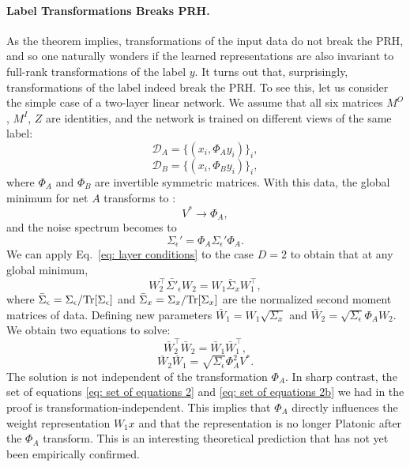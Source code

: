 \documentclass[11pt]{article}
\theoremstyle{plain}
\newcommand{\Tr}{{\rm Tr}}
\begin{document}
\paragraph{Label Transformations Breaks PRH.} As the theorem implies, transformations of the input data do not break the PRH, and so one naturally wonders if the learned representations are also invariant to full-rank transformations of the label $y$. It turns out that, surprisingly, transformations of the label indeed break the PRH. To see this, let us consider the simple case of a two-layer linear network. We assume that all six matrices $M^O$, $M^I$, $Z$ are identities, and the  network is trained on different views of the same label:
\begin{equation}
    \mathcal{D}_A = \{(x_i, \Phi_A y_i )\}_i,
\end{equation}
\begin{equation}
    \mathcal{D}_B = \{(x_i, \Phi_B y_i )\}_i,
\end{equation}
where $\Phi_A$ and $\Phi_B$ are invertible symmetric matrices. With this data, the global minimum for net $A$ transforms to :
\begin{equation}
    V^* \to  \Phi_A,
\end{equation}
and the noise spectrum becomes to
\begin{equation}
    \Sigma_\epsilon' =  \Phi_A \Sigma_\epsilon' \Phi_A.
\end{equation}
We can apply Eq.~\eqref{eq: layer conditions} to the case $D=2$ to obtain that at any global minimum,
\begin{equation}
    W_2^\top \bar{\Sigma'}_\epsilon W_2 = W_1 \bar{\Sigma}_x W_1^\top,
\end{equation}
where $\bar{\Sigma}_\epsilon = {\Sigma}_\epsilon/\Tr[{\Sigma}_\epsilon]$ and $\bar{\Sigma}_x = {\Sigma}_x/\Tr[{\Sigma}_x]$ are the normalized second moment matrices of data. Defining new parameters $\bar{W}_1 = {W}_1 \sqrt{\Sigma_x}$ and $\bar{W}_2 =  \sqrt{\Sigma_\epsilon}\Phi_A {W}_2$. We obtain two equations to solve:
\begin{equation}
    \bar{W}_2^\top \bar{W}_2 = \bar{W}_1 \bar{W}_1^\top,
\end{equation}
\begin{equation}
    \bar{W}_2 \bar{W}_1 = \sqrt{\Sigma_\epsilon} \Phi_A^2 V^*.
\end{equation}
The solution is not independent of the transformation $\Phi_A$. In sharp contrast, the set of equations \eqref{eq: set of equations 2} and \eqref{eq: set of equations 2b} we had in the proof is transformation-independent. This implies that $\Phi_A$ directly influences the weight representation $W_1x$ and that the representation is no longer Platonic after the $\Phi_A$ transform. This is an interesting theoretical prediction that has not yet been empirically confirmed.
\end{document}
